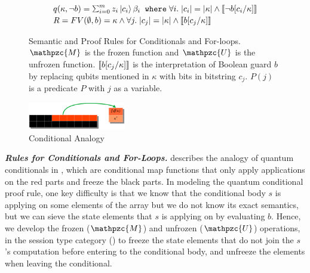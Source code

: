 \begin{figure}[t]
{\begin{mathpar}
  \end{mathpar}
}
{\footnotesize
\[
\begin{array}{l}
q(\kappa,\neg b) = \schai{m}{z_i}{c_{i}}{\beta_i}
\;\;\texttt{where}\;\forall i.\;\slen{c_{i}}=\slen{\kappa}\wedge \denote{\neg b[c_{i}/\kappa]}
\\[0.2em]
R = FV(\emptyset,b)=\kappa \wedge \forall j.\; \slen{c_{j}}=\slen{\kappa}\wedge\denote{b[c_{j}/\kappa]}
\end{array}
\]
}
\caption{Semantic and Proof Rules for Conditionals and For-loops. $\mathpzc{M}$ is the frozen function and $\mathpzc{U}$ is the unfrozen function. $\denote{b[c_{j}/\kappa]}$ is the interpretation of Boolean guard $b$ by replacing qubits mentioned in $\kappa$ with bits in bitstring $c_{j}$.  $P(j)$ is a predicate $P$ with $j$ as a variable. }
\label{fig:qafny-mu-rules}
\end{figure}

\begin{figure}
  \includegraphics[width=0.38\textwidth]{conditional}
  \caption{Conditional Analogy}
\label{fig:qafny-con-analog}
\end{figure} 

\noindent\textbf{\textit{Rules for Conditionals and For-Loops.}}\label{sec:conditionals}
 describes the analogy of quantum conditionals in \qafny, which are conditional map functions that only apply applications on the red parts and freeze the black parts.
In modeling the quantum conditional proof rule, one key difficulty is that we know that the conditional body $s$ is applying on some elements of the array but we do not know its exact semantics, but we can sieve the state elements that $s$ is applying on by evaluating $b$. Hence, we develop the frozen ($\mathpzc{M}$) and unfrozen ($\mathpzc{U}$) operations, in the session type category () to freeze the state elements that do not join the $s$'s computation before entering to the conditional body, and unfreeze the elements when leaving the conditional.

